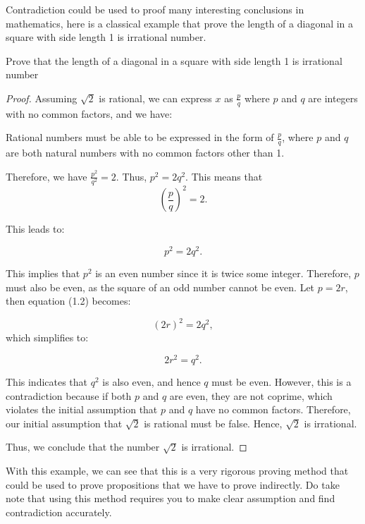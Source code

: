 \documentclass[
	12pt, %
	fleqn, %
	a4paper, %
]{LegrandOrangeBook}
\begin{document}
Contradiction could be used to proof many interesting conclusions in mathematics, here is a classical example that prove the length of a diagonal in a square with side length 1 is irrational number.
\begin{example}
    Prove that the length of a diagonal in a square with side length 1 is irrational number
\end{example}
\begin{proof}
    Assuming $\sqrt{2}$ is rational, we can express $x$ as $\frac{p}{q}$ where $p$ and $q$ are integers with no common factors, and we have:
\begin{remark}
        Rational numbers must be able to be expressed in the form of $\frac{p}{q}$, where $p$ and $q$ are both natural numbers with no common factors other than 1.
    \end{remark}
    Therefore, we have $\frac{p^2}{q^2} = 2$. Thus,  $p^2 = 2q^2$. This means that 
\begin{equation}
\left(\frac{p}{q}\right)^2 = 2.
\end{equation}

This leads to:

\begin{equation}
p^2 = 2q^2.
\end{equation}

This implies that $p^2$ is an even number since it is twice some integer. Therefore, $p$ must also be even, as the square of an odd number cannot be even. Let $p = 2r$, then equation (1.2) becomes:

\begin{equation}
(2r)^2 = 2q^2,
\end{equation}
which simplifies to:

\begin{equation}
2r^2 = q^2.
\end{equation}

This indicates that $q^2$ is also even, and hence $q$ must be even. However, this is a contradiction because if both $p$ and $q$ are even, they are not coprime, which violates the initial assumption that $p$ and $q$ have no common factors. Therefore, our initial assumption that $\sqrt{2}$ is rational must be false. Hence, $\sqrt{2}$ is irrational.

Thus, we conclude that the number $\sqrt{2}$ is irrational.
    
\end{proof}
With this example, we can see that this is a very rigorous proving method that could be used to prove propositions that we have to prove indirectly. Do take note that using this method requires you to make clear assumption and find contradiction accurately. 
\end{document}
